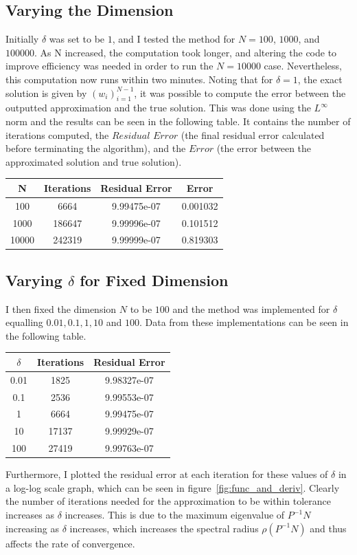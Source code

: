 \documentclass[10pt]{article}
\begin{document}
\subsection{Varying the Dimension}
Initially $\delta$ was set to be $1$, and I tested the method for $N=100$, $1000$, and $100000$. As N increased, the computation took longer, and altering the code to improve efficiency was needed in order to run the $N=10000$ case. Nevertheless, this computation now runs within two minutes. Noting that for $\delta = 1$, the exact solution is given by $(w_i)_{i=1}^{N-1}$, it was possible to compute the error between the outputted approximation and the true solution. This was done using the $L^\infty$ norm and the results can be seen in the following table. It contains the number of iterations computed, the $\textit{Residual Error}$ (the final residual error calculated before terminating the algorithm), and the $\textit{Error}$ (the error between the approximated solution and true solution).

\begin{center}
 \begin{tabular}{||c c c c ||}
 \hline
 N & Iterations & Residual Error & Error \\ [0.5ex]
 \hline\hline
 100 & 6664 & 9.99475e-07 & 0.001032 \\
 \hline
 1000 & 186647 & 9.99996e-07 & 0.101512  \\
 \hline
 10000 & 242319 & 9.99999e-07 & 0.819303 \\
 \hline
\end{tabular}
\end{center}

\subsection{Varying $\delta$ for Fixed Dimension}
I then fixed the dimension $N$ to be $100$ and the method was implemented for $\delta$ equalling $0.01,0.1,1,10$ and $100$. Data from these implementations can be seen in the following table.

\begin{center}
 \begin{tabular}{||c c c ||}
 \hline
 $\delta$ & Iterations & Residual Error \\ [0.5ex]
 \hline\hline
 0.01 & 1825 & 9.98327e-07  \\
 \hline
 0.1 & 2536 & 9.99553e-07  \\
 \hline
 1 & 6664 & 9.99475e-07 \\
 \hline
 10 & 17137 & 9.99929e-07 \\
 \hline
 100 & 27419 & 9.99763e-07 \\
 \hline
\end{tabular}
\end{center}
Furthermore, I plotted the residual error at each iteration for these values of $\delta$ in a log-log scale graph, which can be seen in figure~\ref{fig:func_and_deriv}.
Clearly the number of iterations needed for the approximation to be within tolerance increases as $\delta$ increases. This is due to the maximum eigenvalue of $P^{-1}N$ increasing as $\delta$ increases, which increases the spectral radius $\rho(P^{-1}N)$ and thus affects the rate of convergence.
\end{document}

